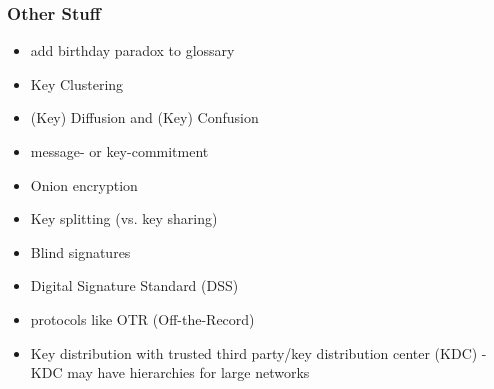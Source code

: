 \subsubsection{Other Stuff}\label{sec:TEMPORARY_LABEL:minor}
\begin{itemize}
	\item add birthday paradox to glossary
	\item Key Clustering
	\item (Key) Diffusion and (Key) Confusion
	\item message- or key-commitment
	\item Onion encryption
	\item Key splitting (vs. key sharing)
	\item Blind signatures
	\item Digital Signature Standard (DSS)
	\item protocols like OTR (Off-the-Record)
	\item Key distribution with trusted third party/key distribution center (KDC) - KDC may have hierarchies for large networks

\end{itemize}
